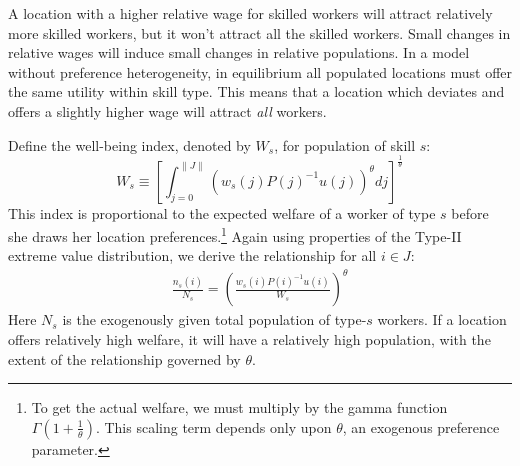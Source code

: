 \documentclass[12 pt]{article}
\begin{document}
A location with a higher relative wage for skilled workers will attract relatively more skilled workers, but it won't attract all the skilled workers.  Small changes in relative wages will induce small changes in relative populations.  In a model without preference heterogeneity, in equilibrium all populated locations must offer the same utility within skill type.  This means that a location which deviates and offers a slightly higher wage will attract \emph{all} workers.

Define the well-being index, denoted by $W_s$, for population of skill $s$:
\begin{equation*}
    W_s \equiv \left[\int_{j=0}^{\|J\|}\left(w_s(j) P(j)^{-1} u(j)\right)^\theta dj\right]^{\frac{1}{\theta}}
\end{equation*}
This index is proportional to the expected welfare of a worker of type $s$ before she draws her location preferences.\footnote{To get the actual welfare, we must multiply by the gamma function $\Gamma(1 +\frac{1}{\theta})$.  This scaling term depends only upon $\theta$, an exogenous preference parameter.}  Again using properties of the Type-II extreme value distribution, we derive the relationship for all $i \in J$:
\begin{eqnarray}\label{eq:indiff}
    \frac{n_s(i)}{N_s} = \left(\frac{w_s(i) P(i)^{-1} u(i)}{W_s}\right)^{\theta}
\end{eqnarray}
Here $N_s$ is the exogenously given total population of type-$s$ workers. If a location offers relatively high welfare, it will have a relatively high population, with the extent of the relationship governed by $\theta$.
\end{document}

